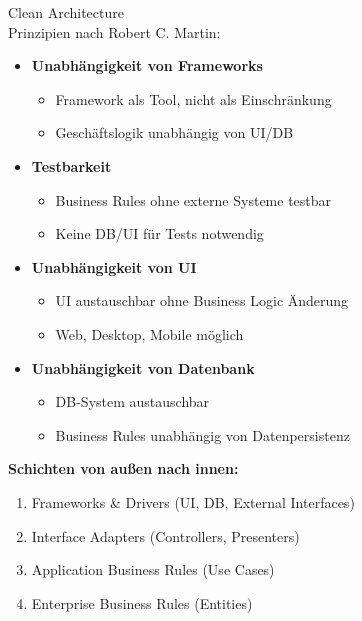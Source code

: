 \begin{KR}{Clean Architecture}\\
Prinzipien nach Robert C. Martin:

\begin{itemize}
    \item \textbf{Unabhängigkeit von Frameworks}
    \begin{itemize}
        \item Framework als Tool, nicht als Einschränkung
        \item Geschäftslogik unabhängig von UI/DB
    \end{itemize}
    
    \item \textbf{Testbarkeit}
    \begin{itemize}
        \item Business Rules ohne externe Systeme testbar
        \item Keine DB/UI für Tests notwendig
    \end{itemize}
    
    \item \textbf{Unabhängigkeit von UI}
    \begin{itemize}
        \item UI austauschbar ohne Business Logic Änderung
        \item Web, Desktop, Mobile möglich
    \end{itemize}
    
    \item \textbf{Unabhängigkeit von Datenbank}
    \begin{itemize}
        \item DB-System austauschbar
        \item Business Rules unabhängig von Datenpersistenz
    \end{itemize}
\end{itemize}

\textbf{Schichten von außen nach innen:}
\begin{enumerate}
    \item Frameworks \& Drivers (UI, DB, External Interfaces)
    \item Interface Adapters (Controllers, Presenters)
    \item Application Business Rules (Use Cases)
    \item Enterprise Business Rules (Entities)
\end{enumerate}
\end{KR}

